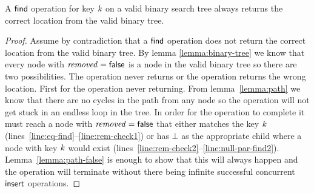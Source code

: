 \begin{lemma}
\label{lemma:find}
A $\act{find}$ operation for key $\ms{k}$ on a valid binary search tree always returns the correct location from the valid binary tree.
\end{lemma}
\begin{proof}
Assume by contradiction that a $\act{find}$ operation does not return the correct location from the valid binary tree.
By lemma \ref{lemma:binary-tree} we know that every node with $\ms{removed}=\lit{false}$ is a node in the valid binary tree so
there are two possibilities.
The operation never returns or the operation returns the wrong location.
First for the operation never returning.
From lemma~\ref{lemma:path} we know that there are no cycles in the path from any node so the operation will not get stuck in an endless loop in the tree.
In order for the operation to complete it must reach a node with $\ms{removed}=\lit{false}$ that either matches the key $\ms{k}$ (lines~\ref{line:eq-find}--\ref{line:rem-check1}) or
has $\bot$ as the appropriate child where a node with key $\ms{k}$ would exist (lines~\ref{line:rem-check2}--\ref{line:null-par-find2}).
Lemma~\ref{lemma:path-false} is enough to show that this will always happen and the operation will terminate without there
being infinite successful concurrent $\act{insert}$ operations.


\end{proof}
